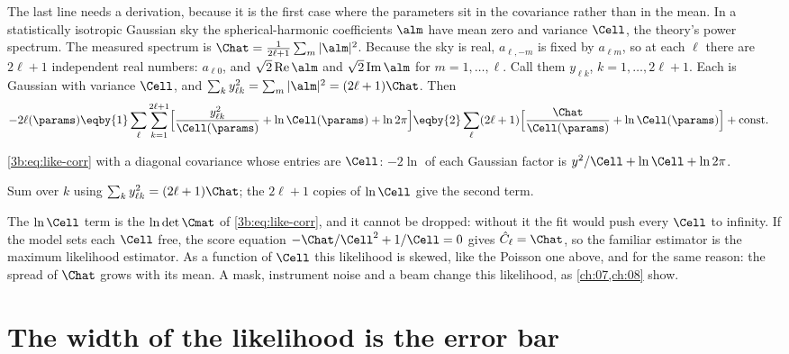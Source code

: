 The last line needs a derivation, because it is the first case where the
parameters sit in the covariance rather than in the mean. In a statistically
isotropic Gaussian sky the spherical-harmonic coefficients $\alm$ have mean
zero and variance $\Cell$, the theory's power spectrum. The measured
spectrum is $\Chat=\frac{1}{2\ell+1}\sum_m|\alm|^2$. Because the sky is real,
$a_{\ell,-m}$ is fixed by $a_{\ell m}$, so at each $\ell$ there are
$2\ell+1$ independent real numbers: $a_{\ell0}$, and $\sqrt2\,\mathrm{Re}\,\alm$
and $\sqrt2\,\mathrm{Im}\,\alm$ for $m=1,\dots,\ell$. Call them $y_{\ell k}$,
$k=1,\dots,2\ell+1$. Each is Gaussian with variance $\Cell$, and
$\sum_ky_{\ell k}^2=\sum_m|\alm|^2=(2\ell+1)\Chat$. Then
\begin{align*}
  -2\ell(\params)
  &\eqby{1}\sum_\ell\sum_{k=1}^{2\ell+1}\Bigl[\frac{y_{\ell k}^2}{\Cell(\params)}+\ln\Cell(\params)+\ln2\pi\Bigr]
  \eqby{2}\sum_\ell(2\ell+1)\Bigl[\frac{\Chat}{\Cell(\params)}+\ln\Cell(\params)\Bigr]+\text{const}.
\end{align*}
\begin{explain}
  \item \eqref{3b:eq:like-corr} with a diagonal covariance whose entries
        are $\Cell$: $-2\ln$ of each Gaussian factor is
        $y^2/\Cell+\ln\Cell+\ln2\pi$.
  \item Sum over $k$ using $\sum_ky_{\ell k}^2=(2\ell+1)\Chat$; the $2\ell+1$
        copies of $\ln\Cell$ give the second term.
\end{explain}
The $\ln\Cell$ term is the $\ln\det\Cmat$ of \eqref{3b:eq:like-corr}, and it
cannot be dropped: without it the fit would push every $\Cell$ to
infinity. If the model sets each $\Cell$ free, the score equation
$-\Chat/\Cell^2+1/\Cell=0$ gives $\hat C_\ell=\Chat$, so the familiar
estimator is the maximum likelihood estimator. As a function of $\Cell$
this likelihood is skewed, like the Poisson one above, and for the same
reason: the spread of $\Chat$ grows with its mean. A mask, instrument noise
and a beam change this likelihood, as \cref{ch:07,ch:08} show.
\section{The width of the likelihood is the error bar}
\label{3b:sec:curvature}

